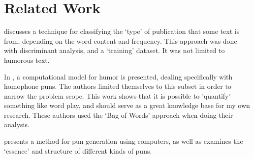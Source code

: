 \section{Related Work}

\cite{Stamatatos:2000:TGD:992730.992763} discusses a technique for classifying the `type' of publication that some text is from, depending on the word content and frequency. This approach was done with discriminant analysis, and a `training' dataset. It was not limited to humorous text.

In \cite{kaofunny}, a computational model for humor is presented, dealing specifically with homophone puns. The authors limited themselves to this subset in order to narrow the problem scope. This work shows that it is possible to 'quantify' something like word play, and should serve as a great knowledge base for my own research. These authors used the `Bag of Words' approach when doing their analysis.

\cite{ritchie2005computational} presents a method for pun generation using computers, as well as examines the `essence' and structure of different kinds of puns.

